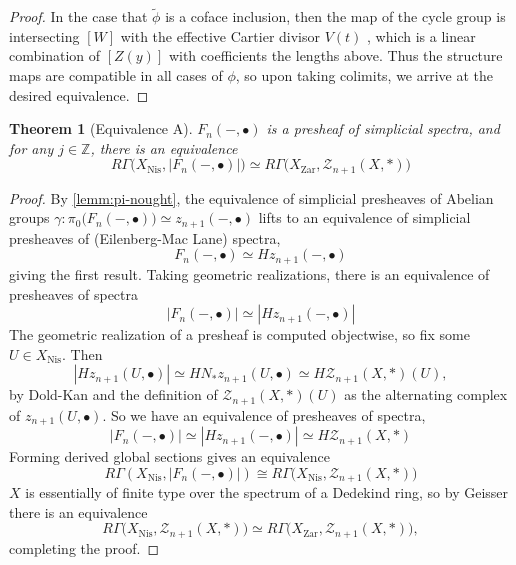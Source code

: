 \documentclass[11pt, twoside]{article}
\numberwithin{equation}{section}
\newtheorem{theorem}[equation]{Theorem}
\theoremstyle{definition}
\newcommand{\bb}[1]{\mathbb{#1}}
\newcommand{\nis}{\mathrm{Nis}}
\begin{document}
\begin{proof}
In the case that \(\tilde{\phi}\) is a coface inclusion, then the map of the cycle group is intersecting \([W]\) with the effective Cartier divisor \(V(t)\) \cite[\S 2.3]{Ful}, which is a linear combination of \([Z(y)]\) with coefficients the lengths above. Thus the structure maps are compatible in all cases of \(\phi\), so upon taking colimits, we arrive at the desired equivalence.
\end{proof}

\begin{theorem}[Equivalence A]\label{thm:equiv-A}
\(F_n( -, \bullet)\) is a presheaf of simplicial spectra, and for any \(j \in \bb{Z}\), there is an equivalence 
\begin{equation}
R\Gamma\big(X_\nis, |F_n(-, \bullet)|\big) \simeq R\Gamma \big(X_\mathrm{Zar}, \mathcal{Z}_{n + 1}(X, *)\big)
\end{equation}
\end{theorem}

\begin{proof}
By \ref{lemm:pi-nought}, the equivalence of simplicial presheaves of Abelian groups \(\gamma \colon \pi_0 \big(F_n( -, \bullet)\big) \simeq z_{n + 1}( -, \bullet)\) lifts to an equivalence of simplicial presheaves of (Eilenberg-Mac Lane) spectra,
\begin{equation}\label{eq:EMFn}
F_n( -, \bullet) \simeq Hz_{n + 1}( - , \bullet)
\end{equation}
giving the first result.
Taking geometric realizations, there is an equivalence of presheaves of spectra 
\[|F_n( -, \bullet)| \simeq |Hz_{n + 1}( -, \bullet)|\]
The geometric realization of a presheaf is computed objectwise, so fix some \(U \in X_\nis\). Then  
\[|H z_{n + 1}(U, \bullet)| \simeq H N_*z_{n + 1}(U, \bullet) \simeq H \mathcal{Z}_{n + 1}(X, *)(U),\]
by Dold-Kan and the definition of \(\mathcal{Z}_{n + 1}(X, *)(U)\) as the alternating complex of \(z_{n + 1}(U , \bullet)\). So we have an equivalence of presheaves of spectra, 
\[|F_n( -, \bullet)| \simeq |Hz_{n + 1}(- , \bullet)| \simeq H \mathcal{Z}_{n + 1}(X, *)\]
Forming derived global sections gives an equivalence  
\[R\Gamma(X_\nis, |F_n( -, \bullet)|) \cong R\Gamma \big(X_\nis, \mathcal{Z}_{n + 1}(X, *)\big)\]
\(X\) is essentially of finite type over the spectrum of a Dedekind ring, so by Geisser \cite[Proposition 3.6]{Gei} there is an equivalence 
\[R\Gamma\big(X_\nis, \mathcal{Z}_{n + 1}(X, *)\big) \simeq R\Gamma \big(X_\mathrm{Zar}, \mathcal{Z}_{n + 1}(X, *)\big),\]
completing the proof.
\end{proof}
\end{document}
